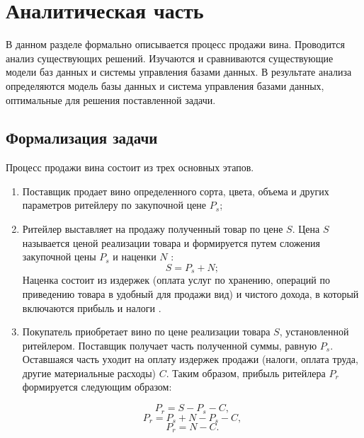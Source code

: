 \chapter{Аналитическая часть}

В данном разделе формально описывается процесс продажи вина. Проводится анализ существующих решений. Изучаются и сравниваются существующие модели баз данных и системы управления базами данных. В результате анализа определяются модель базы данных и система управления базами данных, оптимальные для решения поставленной задачи.

\section{Формализация задачи}

Процесс продажи вина состоит из трех основных этапов.

\begin{enumerate}
	\item Поставщик продает вино определенного сорта, цвета, объема и других параметров ритейлеру по закупочной цене $P_{s}$;
	\item Ритейлер выставляет на продажу полученный товар по цене $S$. Цена $S$ называется ценой реализации товара и формируется путем сложения закупочной цены $P_{s}$ и наценки $N$ \cite{pricing}:
\begin{equation}
    S = P_{s} + N;
\end{equation}
Наценка состоит из издержек (оплата услуг по хранению, операций по приведению товара в удобный для продажи вид) и чистого дохода, в который включаются прибыль и налоги \cite{pricing}. 
	\item Покупатель приобретает вино по цене реализации товара $S$, установленной ритейлером. Поставщик получает часть полученной суммы, равную $P_{s}$. Оставшаяся часть уходит на оплату издержек продажи (налоги, оплата труда, другие материальные расходы) $C$. Таким образом, прибыль ритейлера $P_{r}$ формируется следующим образом:
	
\begin{equation}
    P_{r} = S - P_{s} - C,
\end{equation}
\begin{equation}
    P_{r} = P_{s} + N - P_{s} - C,
\end{equation}
\begin{equation}
    P_{r} = N - C.
\end{equation}
\end{enumerate}

